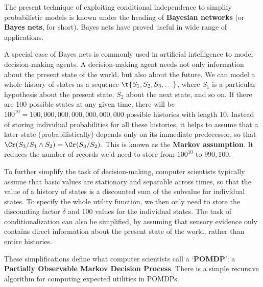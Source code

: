 The present technique of exploiting conditional independence to
simplify probabilistic models is known under the heading of
\textbf{Bayesian networks} (or \textbf{Bayes nets}, for short). Bayes
nets have proved useful in wide range of applications.

A special case of Bayes nets%
is commonly used in artificial intelligence to model decision-making
agents. A decision-making agent needs not only information about the
present state of the world, but also about the future. We can model a
whole history of states as a sequence $\t{S_1,S_2,S_3,\ldots}$, where
$S_1$ is a particular hypothesis about the present state, $S_2$ about
the next state, and so on. If there are 100 possible states at any
given time, there will be $100^{10} = 100,000,000,000,000,000,000$
possible histories with length 10. Instead of storing individual
probabilities for all these histories, it helps to assume that a later
state (probabilistically) depends only on its immediate predecessor,
so that $\Cr(S_3/S_1 \land S_2) = \Cr(S_3/S_2)$. This is known as the
\textbf{Markov assumption}. It reduces the number of records we'd need
to store from $100^{10}$ to $990,100$.%

To further simplify the task of decision-making, computer scientists
typically assume that basic values are stationary and separable across
times, so that the value of a history of states is a discounted sum of
the subvalue for individual states. To specify the whole utility
function, we then only need to store the discounting factor $\delta$
and 100 values for the individual states. The task of
conditionalization can also be simplified, by assuming that sensory
evidence only contains direct information about the present state of
the world, rather than entire histories.

These simplifications define what computer scientists call a
`\textbf{POMDP}': a \textbf{Partially Observable Markov Decision
  Process}. There is a simple recursive algorithm for computing
expected utilities in POMDPs.%


